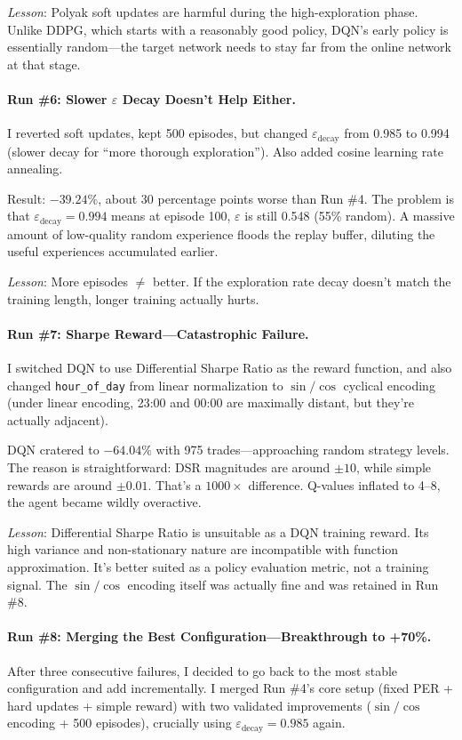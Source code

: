 \documentclass[11pt,a4paper]{article}
\begin{document}
\emph{Lesson}: Polyak soft updates are harmful during the high-exploration phase. Unlike DDPG, which starts with a reasonably good policy, DQN's early policy is essentially random---the target network needs to stay far from the online network at that stage.

\paragraph{Run \#6: Slower $\varepsilon$ Decay Doesn't Help Either.}
I reverted soft updates, kept 500 episodes, but changed $\varepsilon_{\text{decay}}$ from 0.985 to 0.994 (slower decay for ``more thorough exploration''). Also added cosine learning rate annealing.

Result: $-39.24\%$, about 30 percentage points worse than Run \#4. The problem is that $\varepsilon_{\text{decay}}=0.994$ means at episode 100, $\varepsilon$ is still 0.548 (55\% random). A massive amount of low-quality random experience floods the replay buffer, diluting the useful experiences accumulated earlier.

\emph{Lesson}: More episodes $\neq$ better. If the exploration rate decay doesn't match the training length, longer training actually hurts.

\paragraph{Run \#7: Sharpe Reward---Catastrophic Failure.}
I switched DQN to use Differential Sharpe Ratio as the reward function, and also changed \texttt{hour\_of\_day} from linear normalization to $\sin/\cos$ cyclical encoding (under linear encoding, 23:00 and 00:00 are maximally distant, but they're actually adjacent).

DQN cratered to $-64.04\%$ with 975 trades---approaching random strategy levels. The reason is straightforward: DSR magnitudes are around $\pm 10$, while simple rewards are around $\pm 0.01$. That's a $1000\times$ difference. Q-values inflated to 4--8, the agent became wildly overactive.

\emph{Lesson}: Differential Sharpe Ratio is unsuitable as a DQN training reward. Its high variance and non-stationary nature are incompatible with function approximation. It's better suited as a policy evaluation metric, not a training signal. The $\sin/\cos$ encoding itself was actually fine and was retained in Run \#8.

\paragraph{Run \#8: Merging the Best Configuration---Breakthrough to +70\%.}
After three consecutive failures, I decided to go back to the most stable configuration and add incrementally. I merged Run \#4's core setup (fixed PER + hard updates + simple reward) with two validated improvements ($\sin/\cos$ encoding + 500 episodes), crucially using $\varepsilon_{\text{decay}}=0.985$ again.
\end{document}
